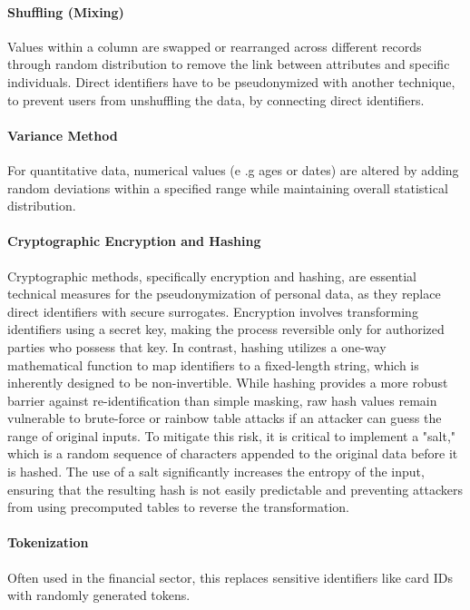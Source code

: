 \paragraph{Shuffling (Mixing)}
Values within a column are swapped or rearranged across different records through random distribution to remove the link between attributes and specific individuals. Direct identifiers have to be pseudonymized with another technique, to prevent users from unshuffling the data, by connecting direct identifiers.
\autocite[77-80]{Krebs2022}
\autocite[41]{gmdsbvd2024praxishilfe}

\paragraph{Variance Method}
For quantitative data, numerical values (e .g ages or dates) are altered by adding random deviations within a specified range while maintaining overall statistical distribution. 
\autocite[77-80]{Krebs2022}
\autocite[42]{gmdsbvd2024praxishilfe}

\paragraph{Cryptographic Encryption and Hashing}
Cryptographic methods, specifically encryption and hashing, are essential technical measures for the pseudonymization of personal data, as they replace direct identifiers with secure surrogates. Encryption involves transforming identifiers using a secret key, making the process reversible only for authorized parties who possess that key. In contrast, hashing utilizes a one-way mathematical function to map identifiers to a fixed-length string, which is inherently designed to be non-invertible. While hashing provides a more robust barrier against re-identification than simple masking, raw hash values remain vulnerable to brute-force or rainbow table attacks if an attacker can guess the range of original inputs. To mitigate this risk, it is critical to implement a "salt," which is a random sequence of characters appended to the original data before it is hashed. The use of a salt significantly increases the entropy of the input, ensuring that the resulting hash is not easily predictable and preventing attackers from using precomputed tables to reverse the transformation.
\autocite[77-80]{Krebs2022}
\autocite[13, 42--44, 84]{gmdsbvd2024praxishilfe}

\paragraph{Tokenization}
Often used in the financial sector, this replaces sensitive identifiers like card IDs with randomly generated tokens.
\autocite[77-80]{Krebs2022}


